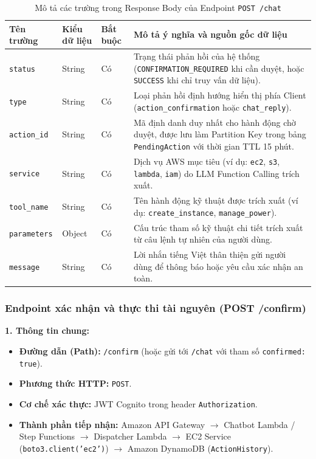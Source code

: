 \documentclass[a4paper,12pt]{article}
\begin{document}
\begin{table}[H]
\centering
\caption{Mô tả các trường trong Response Body của Endpoint \texttt{POST /chat}}
\label{tab:chat_response}
\begingroup
\renewcommand{\arraystretch}{1.12}
\fontsize{10}{13}\selectfont
\begin{tabularx}{\linewidth}{@{}>{\raggedright\arraybackslash}p{2.8cm}>{\raggedright\arraybackslash}p{2.2cm}>{\centering\arraybackslash}p{1.8cm}Y@{}}
\toprule
\textbf{Tên trường} & \textbf{Kiểu dữ liệu} & \textbf{Bắt buộc} & \textbf{Mô tả ý nghĩa và nguồn gốc dữ liệu} \\
\midrule
\texttt{status} & String & Có & Trạng thái phản hồi của hệ thống (\texttt{CONFIRMATION\_REQUIRED} khi cần duyệt, hoặc \texttt{SUCCESS} khi chỉ truy vấn dữ liệu). \\
\texttt{type} & String & Có & Loại phản hồi định hướng hiển thị phía Client (\texttt{action\_confirmation} hoặc \texttt{chat\_reply}). \\
\texttt{action\_id} & String & Có & Mã định danh duy nhất cho hành động chờ duyệt, được lưu làm Partition Key trong bảng \texttt{PendingAction} với thời gian TTL 15 phút. \\
\texttt{service} & String & Có & Dịch vụ AWS mục tiêu (ví dụ: \texttt{ec2}, \texttt{s3}, \texttt{lambda}, \texttt{iam}) do LLM Function Calling trích xuất. \\
\texttt{tool\_name} & String & Có & Tên hành động kỹ thuật được trích xuất (ví dụ: \texttt{create\_instance}, \texttt{manage\_power}). \\
\texttt{parameters} & Object & Có & Cấu trúc tham số kỹ thuật chi tiết trích xuất từ câu lệnh tự nhiên của người dùng. \\
\texttt{message} & String & Có & Lời nhắn tiếng Việt thân thiện gửi người dùng để thông báo hoặc yêu cầu xác nhận an toàn. \\
\bottomrule
\end{tabularx}
\endgroup
\end{table}

\subsubsection{Endpoint xác nhận và thực thi tài nguyên (POST /confirm)}

\textbf{1. Thông tin chung:}
\begin{itemize}
    \item \textbf{Đường dẫn (Path):} \texttt{/confirm} (hoặc gửi tới \texttt{/chat} với tham số \texttt{confirmed: true}).
    \item \textbf{Phương thức HTTP:} \texttt{POST}.
    \item \textbf{Cơ chế xác thực:} JWT Cognito trong header \texttt{Authorization}.
    \item \textbf{Thành phần tiếp nhận:} Amazon API Gateway $\rightarrow$ Chatbot Lambda / Step Functions $\rightarrow$ Dispatcher Lambda $\rightarrow$ EC2 Service (\texttt{boto3.client('ec2')}) $\rightarrow$ Amazon DynamoDB (\texttt{ActionHistory}).
\end{itemize}
\end{document}
